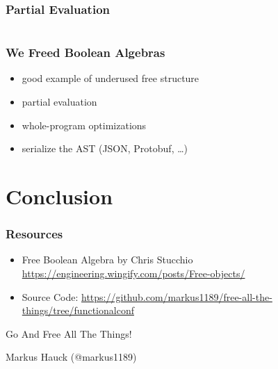\documentclass{beamer}
\begin{document}
\begin{frame}[fragile]
  \frametitle{Partial Evaluation}
    \begin{center}
      \inputminted[fontsize=\footnotesize]{scala}{snippets/functionalconf-spring-meta-site.scala}
      \vspace*{1cm}
      \resizebox{3cm}{!}{
        \begin{tikzpicture}[sibling distance=10em, every node/.style = {shape=rectangle, draw, align=center, color=beamer@codeblue}]]
          \node {False}
          ;
        \end{tikzpicture}
      }
    \end{center}
\end{frame}

\begin{frame}
  \frametitle{We Freed Boolean Algebras}
  \begin{itemize}
  \item good example of underused free structure
  \item partial evaluation
  \item whole-program optimizations
  \item serialize the AST (JSON, Protobuf, \ldots{})
  \end{itemize}
\end{frame}

\section{Conclusion}\label{sec:conclusion}

\begin{frame}
  \frametitle{Resources}
  \begin{itemize}
  \item Free Boolean Algebra by Chris Stucchio \url{https://engineering.wingify.com/posts/Free-objects/}
  \item Source Code: \url{https://github.com/markus1189/free-all-the-things/tree/functionalconf}
  \end{itemize}
\end{frame}

\begin{frame}
  \begin{center}
    \Huge
    Go And Free All The Things!
  \end{center}
  \begin{center}
    Markus Hauck (@markus1189)
  \end{center}
\end{frame}
\end{document}
